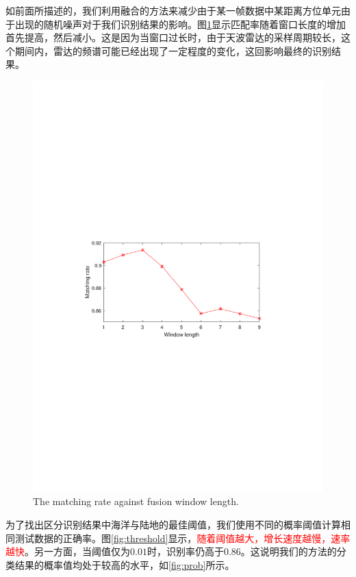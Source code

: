 如前面所描述的，我们利用融合的方法来减少由于某一帧数据中某距离方位单元由于出现的随机噪声对于我们识别结果的影响。图\ref{fig:window}显示匹配率随着窗口长度的增加首先提高，然后减小。这是因为当窗口过长时，由于天波雷达的采样周期较长，这个期间内，雷达的频谱可能已经出现了一定程度的变化，这回影响最终的识别结果。
\begin{figure}[!t]
	\centering
	\includegraphics[width=\textwidth]{figures/window}
	\caption{The matching rate against fusion window length.}
	\label{fig:window}
\end{figure}
为了找出区分识别结果中海洋与陆地的最佳阈值，我们使用不同的概率阈值计算相同测试数据的正确率。图\ref{fig:threshold}显示，\textcolor{red}{随着阈值越大，增长速度越慢，速率越快}。另一方面，当阈值仅为$0.01$时，识别率仍高于$0.86$。这说明我们的方法的分类结果的概率值均处于较高的水平，如\ref{fig:prob}所示。
